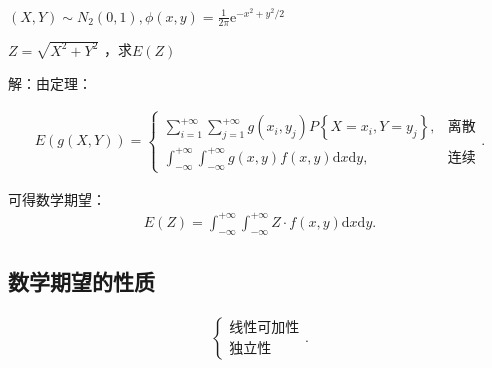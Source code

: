 \begin{eg}
    $(X,Y)\sim N_2\left( 0,1 \right) ,\phi\left( x,y \right) =\frac{1}{2\pi}\mathrm{e}^{-x^2+y^2 /2}$

    $Z=\sqrt{X^2+Y^2} $ ，求$E\left( Z \right) $
\end{eg}
解：由定理：
\begin{rrule}
    \begin{align*}
        E\left( g\left( X,Y \right)  \right) =\begin{cases}
            \displaystyle{\sum_{i=1}^{+\infty}{\sum_{j=1}^{+\infty} g\left( x_{i},y_{j} \right) P\left\{ X=x_{i},Y=y_{j} \right\}} },&\text{离散}\\
            \displaystyle{\int_{-\infty}^{+\infty}{\int_{-\infty}^{+\infty} g\left( x,y \right) f\left( x,y \right)  \mathrm{d}x} \mathrm{d}y},&\text{连续}
        \end{cases}
    .\end{align*}
\end{rrule}
可得数学期望：
\begin{align*}
    E\left( Z \right) =\int_{-\infty}^{+\infty} \int_{-\infty}^{+\infty} Z\cdot f\left( x,y \right)  \mathrm{d}x \mathrm{d}y
.\end{align*}
\subsection{数学期望的性质}%
\label{sub:数学期望的性质}
\begin{align*}
    \begin{cases}
        \text{线性可加性}\\
        \text{独立性}
    \end{cases}
.\end{align*}

